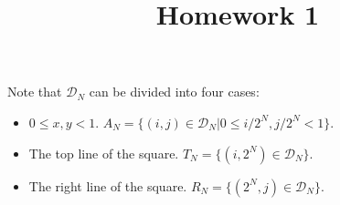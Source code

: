 \documentclass{homework}
\title{Homework 1}
\begin{document}
\maketitle

\begin{problem}{1}
Note that $\mathcal{D}_N$ can be divided into four cases:
\begin{itemize}
\item $0 \leq x, y < 1$.
      $A_N = \{(i, j) \in \mathcal{D}_N | 0 \leq i/2^N, j/2^N < 1\}$.
\item The top line of the square.
      $T_N = \{(i, 2^N) \in \mathcal{D}_N\}$.

\item The right line of the square.
      $R_N = \{(2^N, j) \in \mathcal{D}_N\}$.


\end{itemize}
\end{problem}
\end{document}
